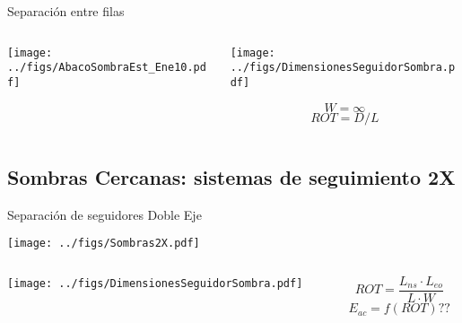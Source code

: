 \documentclass[aspectratio=169, usenames,svgnames,dvipsnames]{beamer}
\begin{document}
\begin{frame}[label={sec:org27bb504}]{Separación entre filas}
\begin{columns}
\begin{column}{0.65\columnwidth}
\begin{center}
\texttt{[image: ../figs/AbacoSombraEst\_Ene10.pdf]}
\end{center}
\end{column}



\begin{column}{0.35\columnwidth}
\begin{center}
\texttt{[image: ../figs/DimensionesSeguidorSombra.pdf]}
\end{center}

\[
W=\infty\]
\[
  ROT=D/L
\]
\end{column}
\end{columns}
\end{frame}

\subsection{Sombras Cercanas: sistemas de seguimiento 2X}
\label{sec:org02d486f}



\begin{frame}[label={sec:org096fa2b}]{Separación de seguidores Doble Eje}
\begin{center}
\texttt{[image: ../figs/Sombras2X.pdf]}
\end{center}

\begin{columns}
\begin{column}{0.6\columnwidth}
\begin{center}
\texttt{[image: ../figs/DimensionesSeguidorSombra.pdf]}
\end{center}
\end{column}

\begin{column}{0.4\columnwidth}
$$ROT=\frac{L_{ns}\cdot L_{eo}}{L \cdot W}$$
$$E_{ac}=f(ROT)??$$
\end{column}
\end{columns}
\end{frame}
\end{document}

